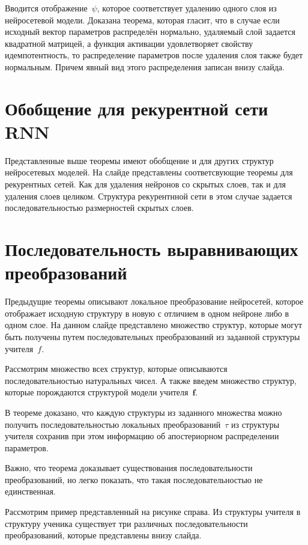 \documentclass[10pt, twoside]{article}
\begin{document}
Вводится отображение~$\psi$, которое соответствует удалению одного слоя из нейросетевой модели.
Доказана теорема, которая гласит, что в случае если исходный вектор параметров распределён нормально, удаляемый слой задается квадратной матрицей, а функция активации удовлетворяет свойству идемпотентность, то распределение параметров после удаления слоя также будет нормальным. Причем явный вид этого распределения записан внизу слайда.

\section{Обобщение для рекурентной сети RNN}
Представленные выше теоремы имеют обобщение и для других структур нейросетевых моделей. На слайде представлены соответсвующие теоремы для рекурентных сетей. Как для удаления нейронов со скрытых слоев, так и для удаления слоев целиком. Структура рекурентнной сети в этом случае задается последовательностью размерностей скрытых слоев.

\section{Последовательность выравнивающих преобразований}
Предыдущие теоремы описывают локальное преобразование нейросетей, которое отображает исходную структуру в новую с отличием в одном нейроне либо в одном слое. На данном слайде представлено множество структур, которые могут быть получены путем последовательных преобразований из заданной структуры учителя~$f$.

Рассмотрим множество всех структур, которые описываются последовательностью натуральных чисел. А также введем множество структур, которые порождаются структурой модели учителя~$\mathbf{f}$.

В теореме доказано, что каждую структуры из заданного множества можно получить последовательностью локальных преобразований~$\tau$ из структуры учителя сохранив при этом информацию об апостериорном распределении параметров.

Важно, что теорема доказывает существования последовательности преобразований, но легко показать, что такая последовательностью не единственная.

Рассмотрим пример представленный на рисунке справа. Из структуры учителя в структуру ученика существует три различных последовательности преобразований, которые представлены внизу слайда.
\end{document}
